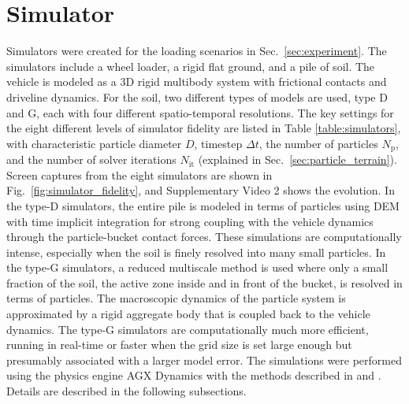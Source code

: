 \documentclass[10pt]{article}
\begin{document}
\section{Simulator}
\label{sec:simulator}
Simulators were created for the loading scenarios in Sec.~\ref{sec:experiment}.
The simulators include a wheel loader, a rigid flat ground, and a pile of soil. 
The vehicle is modeled as a 3D rigid multibody system with frictional contacts
and driveline dynamics.
For the soil, two different types of models are used, type D and G,
each with four different spatio-temporal resolutions. 
The key settings for the eight different levels of simulator fidelity are 
listed in Table \ref{table:simulators}, with characteristic particle diameter $D$, 
timestep $\Delta t$, the number of particles $N_\mathrm{p}$, and the number 
of solver iterations $N_\mathrm{it}$ (explained in Sec.~\ref{sec:particle_terrain}). 
Screen captures from the eight simulators are shown in Fig.~\ref{fig:simulator_fidelity}, and Supplementary Video 2 shows the evolution.
In the type-D simulators, the entire pile is modeled in terms of particles using 
DEM with time implicit integration for strong coupling with 
the vehicle dynamics through the particle-bucket contact forces.
These simulations are computationally intense, 
especially when the soil is finely resolved into many small particles.
In the type-G simulators, a reduced multiscale method is used where 
only a small fraction of the soil, the active zone inside and in front of the bucket, is resolved 
in terms of particles. The macroscopic dynamics of the particle system is
approximated by a rigid aggregate body that is coupled back to the vehicle dynamics.
The type-G simulators are computationally much more efficient, running in real-time or faster 
when the grid size is set large enough but presumably associated with a larger model error.
The simulations were performed using the physics engine AGX Dynamics \cite{AGX20} 
with the methods described in \cite{servin:2014:esn} and \cite{Servin2021}.
Details are described in the following subsections.
\end{document}

